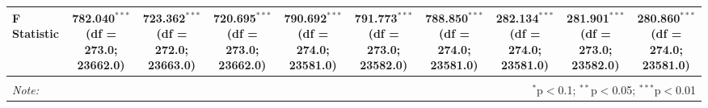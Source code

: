 \begin{table}[!htbp]
\begin{tabular}{@{\extracolsep{5pt}}lccccccccc}
 F Statistic & 782.040$^{***}$ (df = 273.0; 23662.0) & 723.362$^{***}$ (df = 272.0; 23663.0) & 720.695$^{***}$ (df = 273.0; 23662.0) & 790.692$^{***}$ (df = 274.0; 23581.0) & 791.773$^{***}$ (df = 273.0; 23582.0) & 788.850$^{***}$ (df = 274.0; 23581.0) & 282.134$^{***}$ (df = 274.0; 23581.0) & 281.901$^{***}$ (df = 273.0; 23582.0) & 280.860$^{***}$ (df = 274.0; 23581.0) \\
\hline
\hline \\[-1.8ex]
\textit{Note:} & \multicolumn{9}{r}{$^{*}$p$<$0.1; $^{**}$p$<$0.05; $^{***}$p$<$0.01} \\
\end{tabular}
\end{table}
